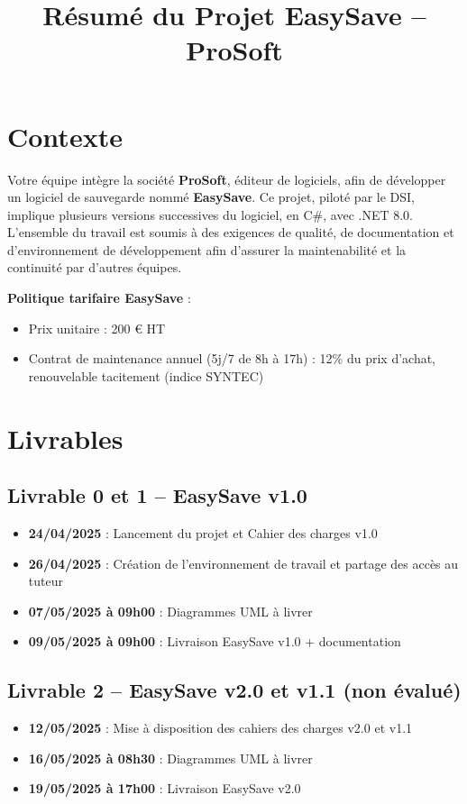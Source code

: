 \documentclass[12pt]{article}
\title{\textbf{Résumé du Projet EasySave – ProSoft}}
\date{}
\begin{document}
\maketitle

\section{Contexte}
Votre équipe intègre la société \textbf{ProSoft}, éditeur de logiciels, afin de développer un logiciel de sauvegarde nommé \textbf{EasySave}. Ce projet, piloté par le DSI, implique plusieurs versions successives du logiciel, en C\#, avec .NET 8.0. L’ensemble du travail est soumis à des exigences de qualité, de documentation et d’environnement de développement afin d’assurer la maintenabilité et la continuité par d'autres équipes.

\textbf{Politique tarifaire EasySave} :
\begin{itemize}
    \item Prix unitaire : 200 € HT
    \item Contrat de maintenance annuel (5j/7 de 8h à 17h) : 12\% du prix d’achat, renouvelable tacitement (indice SYNTEC)
\end{itemize}

\section{Livrables}

\subsection*{Livrable 0 et 1 – EasySave v1.0}
\begin{itemize}
    \item \textbf{24/04/2025} : Lancement du projet et Cahier des charges v1.0
    \item \textbf{26/04/2025} : Création de l’environnement de travail et partage des accès au tuteur
    \item \textbf{07/05/2025 à 09h00} : Diagrammes UML à livrer
    \item \textbf{09/05/2025 à 09h00} : Livraison EasySave v1.0 + documentation
\end{itemize}

\subsection*{Livrable 2 – EasySave v2.0 et v1.1 (non évalué)}
\begin{itemize}
    \item \textbf{12/05/2025} : Mise à disposition des cahiers des charges v2.0 et v1.1
    \item \textbf{16/05/2025 à 08h30} : Diagrammes UML à livrer
    \item \textbf{19/05/2025 à 17h00} : Livraison EasySave v2.0
\end{itemize}
\end{document}
